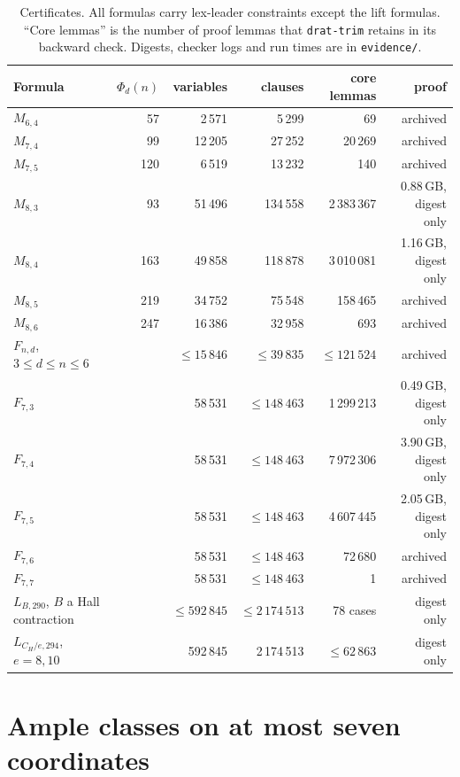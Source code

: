 \documentclass[11pt]{article}
\numberwithin{equation}{section}
\theoremstyle{definition}
\theoremstyle{remark}
\begin{document}
\begin{table}[t]
\centering
\small
\begin{tabular}{@{}lrrrrr@{}}
\toprule
Formula & \(\Phi_d(n)\) & variables & clauses & core lemmas & proof\\
\midrule
\(M_{6,4}\) & 57 & 2\,571 & 5\,299 & 69 & archived\\
\(M_{7,4}\) & 99 & 12\,205 & 27\,252 & 20\,269 & archived\\
\(M_{7,5}\) & 120 & 6\,519 & 13\,232 & 140 & archived\\
\(M_{8,3}\) & 93 & 51\,496 & 134\,558 & 2\,383\,367 & 0.88\,GB, digest only\\
\(M_{8,4}\) & 163 & 49\,858 & 118\,878 & 3\,010\,081 & 1.16\,GB, digest only\\
\(M_{8,5}\) & 219 & 34\,752 & 75\,548 & 158\,465 & archived\\
\(M_{8,6}\) & 247 & 16\,386 & 32\,958 & 693 & archived\\
\midrule
\(F_{n,d}\), \(3\le d\le n\le6\) & & \(\le15\,846\) & \(\le39\,835\) & \(\le121\,524\) & archived\\
\(F_{7,3}\) & & 58\,531 & \(\le148\,463\) & 1\,299\,213 & 0.49\,GB, digest only\\
\(F_{7,4}\) & & 58\,531 & \(\le148\,463\) & 7\,972\,306 & 3.90\,GB, digest only\\
\(F_{7,5}\) & & 58\,531 & \(\le148\,463\) & 4\,607\,445 & 2.05\,GB, digest only\\
\(F_{7,6}\) & & 58\,531 & \(\le148\,463\) & 72\,680 & archived\\
\(F_{7,7}\) & & 58\,531 & \(\le148\,463\) & 1 & archived\\
\midrule
\(L_{B,290}\), \(B\) a Hall contraction & & \(\le592\,845\) & \(\le2\,174\,513\) & 78 cases & digest only\\
\(L_{C_H/e,294}\), \(e=8,10\) & & 592\,845 & 2\,174\,513 & \(\le62\,863\) & digest only\\
\bottomrule
\end{tabular}
\caption{Certificates.  All formulas carry lex-leader constraints except the
lift formulas.  ``Core lemmas'' is the number of proof lemmas that
\texttt{drat-trim} retains in its backward check.  Digests, checker logs and
run times are in \texttt{evidence/}.}
\label{tab:certificates}
\end{table}

\section{Ample classes on at most seven coordinates}
\label{sec:seven}
\end{document}
